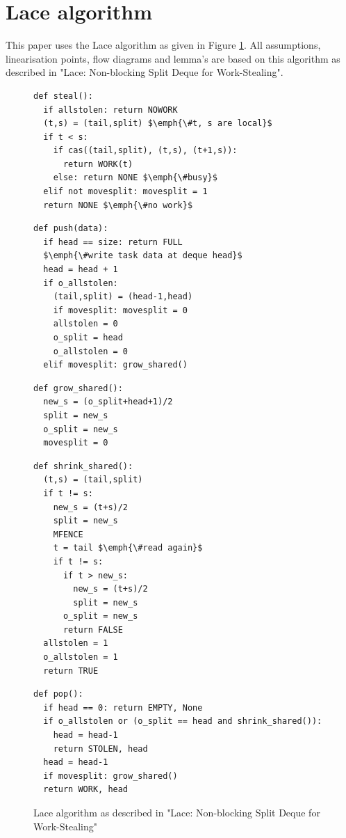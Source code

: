 \documentclass{sig-alternate-br}
\begin{document}


\appendix
\section{Lace algorithm}
This paper uses the Lace algorithm as given in Figure \ref{fig:Lace}.
All assumptions, linearisation points, flow diagrams and lemma's are based on this algorithm as described in "Lace: Non-blocking Split Deque for Work-Stealing"\cite{vanDijk2014206}.
\begin{figure}
\begin{lstlisting}
def steal():
  if allstolen: return NOWORK
  (t,s) = (tail,split) $\emph{\#t, s are local}$
  if t < s:
    if cas((tail,split), (t,s), (t+1,s)):
      return WORK(t)
    else: return NONE $\emph{\#busy}$
  elif not movesplit: movesplit = 1
  return NONE $\emph{\#no work}$
\end{lstlisting}
\begin{lstlisting}[firstnumber=10]
def push(data):
  if head == size: return FULL
  $\emph{\#write task data at deque head}$
  head = head + 1
  if o_allstolen:
    (tail,split) = (head-1,head)
    if movesplit: movesplit = 0
    allstolen = 0
    o_split = head
    o_allstolen = 0
  elif movesplit: grow_shared()
\end{lstlisting}
\begin{lstlisting}[firstnumber=21]
def grow_shared():
  new_s = (o_split+head+1)/2
  split = new_s
  o_split = new_s
  movesplit = 0
\end{lstlisting}
\begin{lstlisting}[firstnumber=26]
def shrink_shared():
  (t,s) = (tail,split)
  if t != s:
    new_s = (t+s)/2
    split = new_s
    MFENCE
    t = tail $\emph{\#read again}$
    if t != s:
      if t > new_s:
        new_s = (t+s)/2
        split = new_s
      o_split = new_s
      return FALSE
  allstolen = 1
  o_allstolen = 1
  return TRUE
\end{lstlisting}
\begin{lstlisting}[firstnumber=42]
def pop():
  if head == 0: return EMPTY, None
  if o_allstolen or (o_split == head and shrink_shared()):
    head = head-1
    return STOLEN, head
  head = head-1
  if movesplit: grow_shared()
  return WORK, head
\end{lstlisting}
\caption{Lace algorithm as described in "Lace: Non-blocking Split Deque for Work-Stealing"\cite{vanDijk2014206}}
\label{fig:Lace}
\end{figure}
\end{document}
